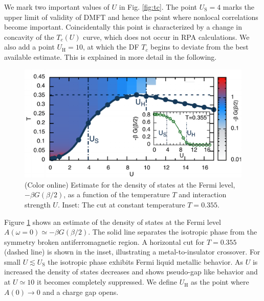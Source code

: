 \documentclass[aps,prb,twocolumn,amsmath,notitlepage,floatfix,footinbib,superscriptaddress,showpacs, showkeys]{revtex4-1}
\begin{document}
We mark two important values of $U$ in Fig. \ref{fig:tc}. 
The point $U_\text{S} = 4$ marks the upper limit of validity of DMFT and hence the point where nonlocal correlations become important.  
Coincidentally this point is characterized by a change in concavity of the $T_c(U)$ curve, which does not occur in RPA calculations. 
We also add a point $U_\text{H} = 10$, at which the DF $T_c$ begins to deviate from the best available estimate.
This is explained in more detail in the following.

\begin{figure}[ht]
\begin{center}
\includegraphics[width=\columnwidth]{fig2.pdf}\end{center}\vspace*{-1.5em}
\caption{(Color online) Estimate for the density of states at the Fermi level, $-\beta G(\beta / 2)$, as a function of the temperature $T$ and interaction strength $U$. Inset: The cut at constant temperature $T=0.355$.}
\label{fig:dos}
\end{figure}

Figure \ref{fig:dos} shows an estimate of the density of states at the Fermi level $A(\omega = 0) \simeq -\beta G(\beta / 2)$. 
The solid line separates the isotropic phase from the symmetry broken antiferromagnetic region. 
A horizontal cut for $T = 0.355$ (dashed line) is shown in the inset, illustrating a metal-to-insulator crossover. 
For small $U\lesssim U_\text{S}$ the isotropic phase exhibits Fermi liquid metallic behavior.
As $U$ is increased the density of states decreases and shows pseudo-gap like behavior \cite{FuchsGull:2011} and at $U \simeq 10$ it becomes completely suppressed. 
We define $U_\text{H}$ as the point where $A(0) \rightarrow 0$ and a charge gap opens.
\end{document}
